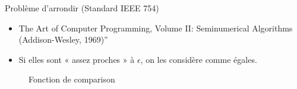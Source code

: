 \documentclass[10pt]{beamer}
\begin{document}
\begin{frame}{Problème d'arrondir (Standard IEEE 754)}
    \begin{itemize}
        \item The Art of Computer Programming, Volume II: Seminumerical Algorithms (Addison-Wesley, 1969)”
        \item Si elles sont « assez proches » à $\epsilon$, on les considère comme égales.
    \end{itemize}
    \begin{figure}[h]
        \centering
        \caption{Fonction de comparison}
    \end{figure}
\end{frame}
\end{document}
